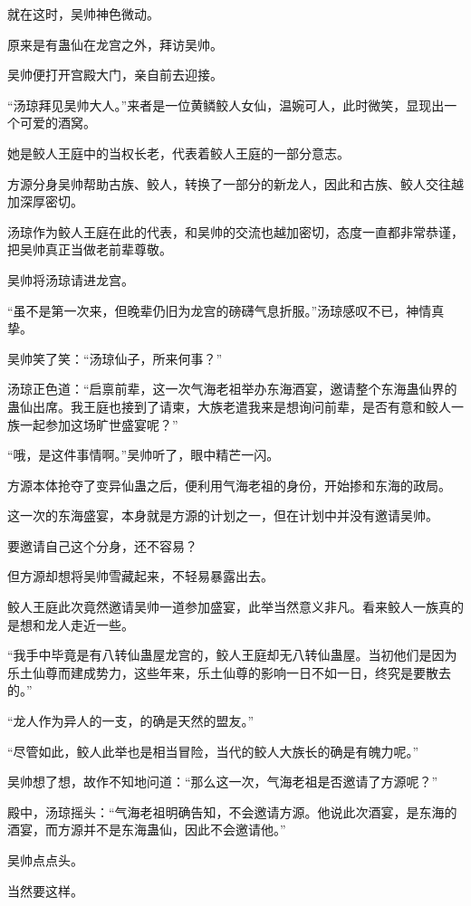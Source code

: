 \begin{this_body}
就在这时，吴帅神色微动。

原来是有蛊仙在龙宫之外，拜访吴帅。

吴帅便打开宫殿大门，亲自前去迎接。

“汤琼拜见吴帅大人。”来者是一位黄鳞鲛人女仙，温婉可人，此时微笑，显现出一个可爱的酒窝。

她是鲛人王庭中的当权长老，代表着鲛人王庭的一部分意志。

方源分身吴帅帮助古族、鲛人，转换了一部分的新龙人，因此和古族、鲛人交往越加深厚密切。

汤琼作为鲛人王庭在此的代表，和吴帅的交流也越加密切，态度一直都非常恭谨，把吴帅真正当做老前辈尊敬。

吴帅将汤琼请进龙宫。

“虽不是第一次来，但晚辈仍旧为龙宫的磅礴气息折服。”汤琼感叹不已，神情真挚。

吴帅笑了笑：“汤琼仙子，所来何事？”

汤琼正色道：“启禀前辈，这一次气海老祖举办东海酒宴，邀请整个东海蛊仙界的蛊仙出席。我王庭也接到了请柬，大族老遣我来是想询问前辈，是否有意和鲛人一族一起参加这场旷世盛宴呢？”

“哦，是这件事情啊。”吴帅听了，眼中精芒一闪。

方源本体抢夺了变异仙蛊之后，便利用气海老祖的身份，开始掺和东海的政局。

这一次的东海盛宴，本身就是方源的计划之一，但在计划中并没有邀请吴帅。

要邀请自己这个分身，还不容易？

但方源却想将吴帅雪藏起来，不轻易暴露出去。

鲛人王庭此次竟然邀请吴帅一道参加盛宴，此举当然意义非凡。看来鲛人一族真的是想和龙人走近一些。

“我手中毕竟是有八转仙蛊屋龙宫的，鲛人王庭却无八转仙蛊屋。当初他们是因为乐土仙尊而建成势力，这些年来，乐土仙尊的影响一日不如一日，终究是要散去的。”

“龙人作为异人的一支，的确是天然的盟友。”

“尽管如此，鲛人此举也是相当冒险，当代的鲛人大族长的确是有魄力呢。”

吴帅想了想，故作不知地问道：“那么这一次，气海老祖是否邀请了方源呢？”

殿中，汤琼摇头：“气海老祖明确告知，不会邀请方源。他说此次酒宴，是东海的酒宴，而方源并不是东海蛊仙，因此不会邀请他。”

吴帅点点头。

当然要这样。


\end{this_body}
